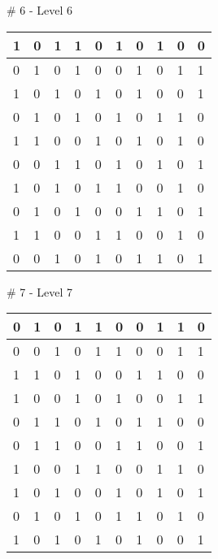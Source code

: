 \smallskip

\# 6 - Level 6 \newline
\begin{tabular}{|m{\collen}|m{\collen}|m{\collen}|m{\collen}|m{\collen}|m{\collen}|m{\collen}|m{\collen}|m{\collen}|m{\collen}|}
\hline
  1 & 0 & 1 & 1 & 0 & 1 & 0 & 1 & 0 & 0 \\
\hline
  0 & 1 & 0 & 1 & 0 & 0 & 1 & 0 & 1 & 1 \\
\hline
  1 & 0 & 1 & 0 & 1 & 0 & 1 & 0 & 0 & 1 \\
\hline
  0 & 1 & 0 & 1 & 0 & 1 & 0 & 1 & 1 & 0 \\
\hline
  1 & 1 & 0 & 0 & 1 & 0 & 1 & 0 & 1 & 0 \\
\hline
  0 & 0 & 1 & 1 & 0 & 1 & 0 & 1 & 0 & 1 \\
\hline
  1 & 0 & 1 & 0 & 1 & 1 & 0 & 0 & 1 & 0 \\
\hline
  0 & 1 & 0 & 1 & 0 & 0 & 1 & 1 & 0 & 1 \\
\hline
  1 & 1 & 0 & 0 & 1 & 1 & 0 & 0 & 1 & 0 \\
\hline
  0 & 0 & 1 & 0 & 1 & 0 & 1 & 1 & 0 & 1 \\
\hline
\end{tabular}


\smallskip

\# 7 - Level 7 \newline
\begin{tabular}{|m{\collen}|m{\collen}|m{\collen}|m{\collen}|m{\collen}|m{\collen}|m{\collen}|m{\collen}|m{\collen}|m{\collen}|}
\hline
  0 & 1 & 0 & 1 & 1 & 0 & 0 & 1 & 1 & 0 \\
\hline
  0 & 0 & 1 & 0 & 1 & 1 & 0 & 0 & 1 & 1 \\
\hline
  1 & 1 & 0 & 1 & 0 & 0 & 1 & 1 & 0 & 0 \\
\hline
  1 & 0 & 0 & 1 & 0 & 1 & 0 & 0 & 1 & 1 \\
\hline
  0 & 1 & 1 & 0 & 1 & 0 & 1 & 1 & 0 & 0 \\
\hline
  0 & 1 & 1 & 0 & 0 & 1 & 1 & 0 & 0 & 1 \\
\hline
  1 & 0 & 0 & 1 & 1 & 0 & 0 & 1 & 1 & 0 \\
\hline
  1 & 0 & 1 & 0 & 0 & 1 & 0 & 1 & 0 & 1 \\
\hline
  0 & 1 & 0 & 1 & 0 & 1 & 1 & 0 & 1 & 0 \\
\hline
  1 & 0 & 1 & 0 & 1 & 0 & 1 & 0 & 0 & 1 \\
\hline
\end{tabular}


\smallskip

